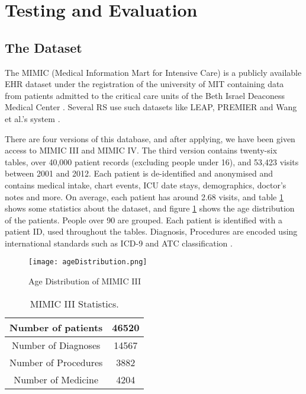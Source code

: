 \section{Testing and Evaluation}

\label{Testing}

\subsection{
The Dataset 
}


The MIMIC (Medical Information Mart for Intensive Care) is a publicly
available EHR dataset under the registration of the university of MIT
containing data from patients admitted to the critical care units of the Beth
Israel Deaconess Medical Center \cite{Johnson2016}.
Several RS use such datasets like LEAP, PREMIER and Wang
et al.'s system \cite{Wang}. 

There are four versions of this database, and after applying, we have been
given access to MIMIC III and MIMIC IV. The third version contains twenty-six
tables, over 40,000 patient records (excluding people under 16), and 53,423
visits between 2001 and 2012. Each patient is de-identified and anonymised and
contains medical intake, chart events, ICU date stays, demographics, doctor's
notes and more. On average, each patient has around 2.68 visits, and table \ref{age}
shows some statistics about the dataset, and figure \ref{statistics} shows the age
distribution of the patients. People over 90 are grouped. Each patient is
identified with a patient ID, used throughout the tables. Diagnosis, Procedures
are encoded using international standards such as ICD-9 and ATC classification .

\begin{figure}[h]
    \texttt{[image: ageDistribution.png]}
    \caption{Age Distribution of MIMIC III}
    \label{age}
\end{figure}


\begin{table}[h]

    \caption{MIMIC III Statistics.}
    \label{statistics}
\begin{center}
\begin{tabular}{ | c | c | }
    \hline
 Number of patients     & 46520 \\ 
    \hline
 Number of Diagnoses    & 14567 \\  
    \hline
 Number of Procedures   & 3882  \\
    \hline
 Number of Medicine     & 4204  \\
    \hline
\end{tabular}
\end{center}

    \end{table}


